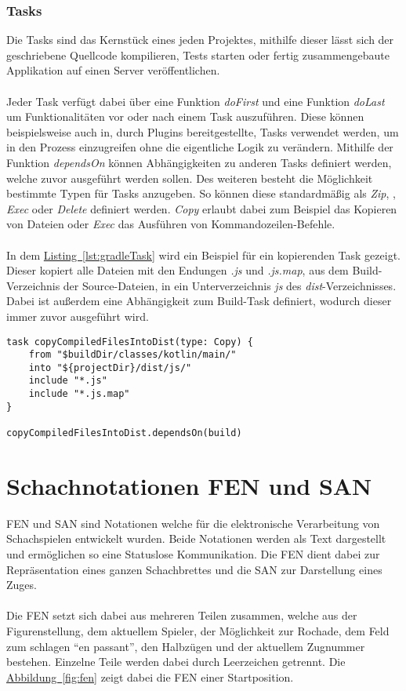 \subsubsection{Tasks}
Die Tasks sind das Kernstück eines jeden Projektes, mithilfe dieser lässt sich der geschriebene Quellcode kompilieren, Tests starten oder fertig zusammengebaute Applikation auf einen Server veröffentlichen.\\
\\
Jeder Task verfügt dabei über eine Funktion \textit{doFirst} und eine Funktion \textit{doLast} um Funktionalitäten vor oder nach einem Task auszuführen. Diese können beispielsweise auch in, durch Plugins bereitgestellte, Tasks verwendet werden, um in den Prozess einzugreifen ohne die eigentliche Logik zu verändern. Mithilfe der Funktion \textit{dependsOn} können Abhängigkeiten zu anderen Tasks definiert werden, welche zuvor ausgeführt werden sollen. Des weiteren besteht die Möglichkeit bestimmte Typen für Tasks anzugeben. So können diese standardmäßig als \textit{Zip}, , \textit{Exec} oder \textit{Delete} definiert werden. \textit{Copy} erlaubt dabei zum Beispiel das Kopieren von Dateien oder \textit{Exec} das Ausführen von Kommandozeilen-Befehle.\\
\\
In dem \hyperref[lst:gradleTask]{Listing~\ref{lst:gradleTask}} wird ein Beispiel für ein kopierenden Task gezeigt. Dieser kopiert alle Dateien mit den Endungen \textit{.js} und \textit{.js.map}, aus dem Build-Verzeichnis der Source-Dateien, in ein Unterverzeichnis \textit{js} des \textit{dist}-Verzeichnisses. Dabei ist außerdem eine Abhängigkeit zum Build-Task definiert, wodurch dieser immer zuvor ausgeführt wird.
\begin{lstlisting}[style=lstStyleFramed, language=Gradle, caption={Beispiel: Gradle-Task}, label=lst:gradleTask, float, floatplacement=T]
task copyCompiledFilesIntoDist(type: Copy) {
	from "$buildDir/classes/kotlin/main/"
	into "${projectDir}/dist/js/"
	include "*.js"
	include "*.js.map"
}

copyCompiledFilesIntoDist.dependsOn(build)
\end{lstlisting}

\section{Schachnotationen FEN und SAN}\label{sec:chessNotation}
\gls{FEN} und \gls{SAN} sind Notationen welche für die elektronische Verarbeitung von Schachspielen entwickelt wurden. Beide Notationen werden als Text dargestellt und ermöglichen so eine Statuslose Kommunikation. Die \gls{FEN} dient dabei zur Repräsentation eines ganzen Schachbrettes und die \gls{SAN} zur Darstellung eines Zuges.\\
\\
Die \gls{FEN} setzt sich dabei aus mehreren Teilen zusammen, welche aus der Figurenstellung, dem aktuellem Spieler, der Möglichkeit zur Rochade, dem Feld zum schlagen \enquote{en passant}, den Halbzügen und der aktuellem Zugnummer bestehen. Einzelne Teile werden dabei durch Leerzeichen getrennt. Die \hyperref[fig:fen]{Abbildung~\ref{fig:fen}} zeigt dabei die \gls{FEN} einer Startposition.\\

